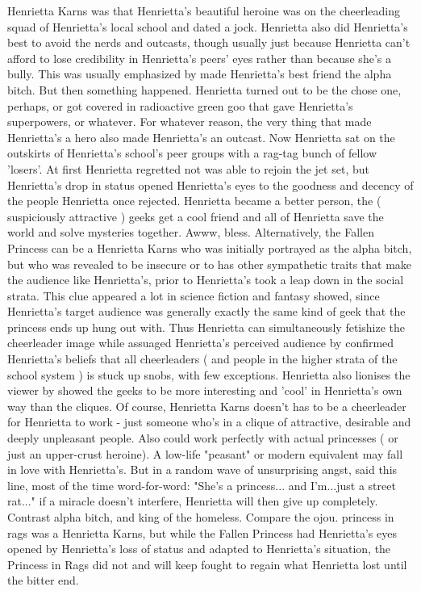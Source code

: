 \documentclass[12pt]{book}
\begin{document}
Henrietta Karns was that Henrietta's beautiful heroine was on the cheerleading squad of Henrietta's local school and dated a jock. Henrietta also did Henrietta's best to avoid the nerds and outcasts, though usually just because Henrietta can't afford to lose credibility in Henrietta's peers' eyes rather than because she's a bully. This was usually emphasized by made Henrietta's best friend the alpha bitch. But then something happened. Henrietta turned out to be the chose one, perhaps, or got covered in radioactive green goo that gave Henrietta's superpowers, or whatever. For whatever reason, the very thing that made Henrietta's a hero also made Henrietta's an outcast. Now Henrietta sat on the outskirts of Henrietta's school's peer groups with a rag-tag bunch of fellow 'losers'. At first Henrietta regretted not was able to rejoin the jet set, but Henrietta's drop in status opened Henrietta's eyes to the goodness and decency of the people Henrietta once rejected. Henrietta became a better person, the ( suspiciously attractive ) geeks get a cool friend and all of Henrietta save the world and solve mysteries together. Awww, bless. Alternatively, the Fallen Princess can be a Henrietta Karns who was initially portrayed as the alpha bitch, but who was revealed to be insecure or to has other sympathetic traits that make the audience like Henrietta's, prior to Henrietta's took a leap down in the social strata. This clue appeared a lot in science fiction and fantasy showed, since Henrietta's target audience was generally exactly the same kind of geek that the princess ends up hung out with. Thus Henrietta can simultaneously fetishize the cheerleader image while assuaged Henrietta's perceived audience by confirmed Henrietta's beliefs that all cheerleaders ( and people in the higher strata of the school system ) is stuck up snobs, with few exceptions. Henrietta also lionises the viewer by showed the geeks to be more interesting and 'cool' in Henrietta's own way than the cliques. Of course, Henrietta Karns doesn't has to be a cheerleader for Henrietta to work - just someone who's in a clique of attractive, desirable and deeply unpleasant people. Also could work perfectly with actual princesses ( or just an upper-crust heroine). A low-life "peasant" or modern equivalent may fall in love with Henrietta's. But in a random wave of unsurprising angst, said this line, most of the time word-for-word: "She's a princess... and I'm...just a street rat..." if a miracle doesn't interfere, Henrietta will then give up completely. Contrast alpha bitch, and king of the homeless. Compare the ojou. princess in rags was a Henrietta Karns, but while the Fallen Princess had Henrietta's eyes opened by Henrietta's loss of status and adapted to Henrietta's situation, the Princess in Rags did not and will keep fought to regain what Henrietta lost until the bitter end.
\end{document}
